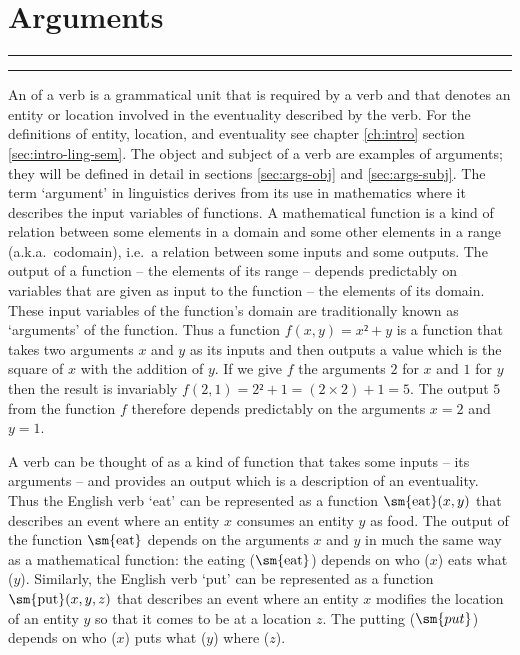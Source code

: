 
\resetexcnt
\chapter{Arguments}\label{ch:args}

\startcontents[chapters]
\noindent\rule[0.5em]{\textwidth}{\heavyrulewidth}
\noindent\rule{\textwidth}{\heavyrulewidth}
\vspace{1\baselineskip}


An  of a verb is a grammatical unit that is required by a verb and that denotes an entity or location involved in the eventuality described by the verb. For the definitions of entity, location, and eventuality see chapter \ref{ch:intro} section \ref{sec:intro-ling-sem}. The object and subject of a verb are examples of arguments; they will be defined in detail in sections \ref{sec:args-obj} and \ref{sec:args-subj}. The term ‘argument’ in linguistics derives from its use in mathematics where it describes the input variables of functions. A mathematical function is a kind of relation between some elements in a domain and some other elements in a range (a.k.a.\ codomain), i.e.\ a relation between some inputs and some outputs. The output of a function – the elements of its range – depends predictably on variables that are given as input to the function – the elements of its domain. These input variables of the function’s domain are traditionally known as ‘arguments’ of the function. Thus a function $f(x, y) = x² + y$ is a function that takes two arguments $x$ and $y$ as its inputs and then outputs a value which is the square of $x$ with the addition of $y$. If we give $f$ the arguments $2$ for $x$ and $1$ for $y$ then the result is invariably $f(2, 1) = 2² + 1 = (2 × 2) + 1 = 5$. The output $5$ from the function $f$ therefore depends predictably on the arguments $x = 2$ and $y = 1$.

A verb can be thought of as a kind of function that takes some inputs – its arguments – and provides an output which is a description of an eventuality. Thus the English verb ‘eat’ can be represented as a function $\text{\sm{eat}}(x, y)$ that describes an event where an entity $x$ consumes an entity $y$ as food. The output of the function $\text{\sm{eat}}$ depends on the arguments $x$ and $y$ in much the same way as a mathematical function: the eating ($\text{\sm{eat}}$) depends on who ($x$) eats what ($y$). Similarly, the English verb ‘put’ can be represented as a function $\text{\sm{put}}(x, y, z)$ that describes an event where an entity $x$ modifies the location of an entity $y$ so that it comes to be at a location $z$. The putting ($\sm{put}$) depends on who ($x$) puts what ($y$) where ($z$).

